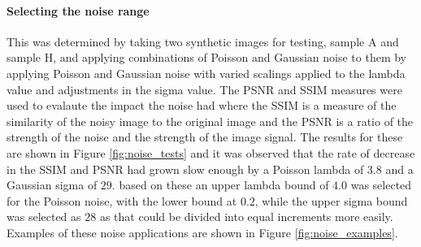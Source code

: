 \paragraph{Selecting the noise range}
This was determined by taking two synthetic images for testing, sample A and sample H, and applying combinations of Poisson and Gaussian noise to them by applying Poisson and Gaussian noise with varied scalings applied to the lambda value and adjustments in the sigma value. The PSNR and SSIM measures were used to evalaute the impact the noise had where the SSIM is a measure of the similarity of the noisy image to the original image and the PSNR is a ratio of the strength of the noise and the strength of the image signal. The results for these are shown in Figure \ref{fig:noise_tests} and it was observed that the rate of decrease in the SSIM and PSNR had grown slow enough by a Poisson lambda of $3.8$ and a Gaussian sigma of $29$. based on these an upper lambda bound of $4.0$ was selected for the Poisson noise, with the lower bound at $0.2$, while the upper sigma bound was selected as $28$ as that could be divided into equal increments more easily. Examples of these noise applications are shown in Figure \ref{fig:noise_examples}.

